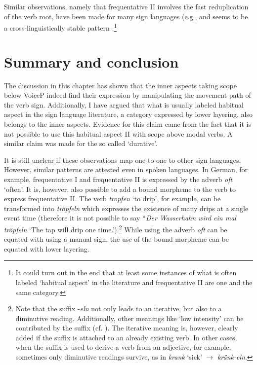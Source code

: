 \noindent Similar observations, namely that frequentative II involves the fast reduplication of the verb root, have been made for many sign languages (e.g., \citealt{bergmandahl1994, sutton1999linguistics, meir2007language} and seems to be a cross-linguistically stable pattern \citep[227]{signgram2017}.\footnote{ It could turn out in the end that at least some instances of what is often labeled `habitual aspect' in the literature and frequentative II are one and the same category. }


\largerpage
\section{Summary and conclusion}
The discussion in this chapter has shown that the inner aspects taking scope below VoiceP indeed find their expression by manipulating the movement path of the verb sign. Additionally, I have argued that what is usually labeled habitual aspect in the sign language literature, a category expressed by lower layering, also belongs to the inner aspects. Evidence for this claim came from the fact that it is not possible to use this habitual aspect II with scope above modal verbs. A similar claim was made for the so called `durative'.

It is still unclear if these observations map one-to-one to other sign languages. However, similar patterns are attested even in spoken languages. In German, for example, frequentative I and frequentative II is expressed by the adverb \textit{oft} `often'. It is, however, also possible to add a bound morpheme to the verb to express frequentative II. The verb \textit{tropfen} `to drip', for example, can be transformed into \textit{tröpfeln} which expresses the existence of many drips at a single event time (therefore it is not possible to say *\textit{Der Wasserhahn wird ein mal tröpfeln} `The tap will drip one time.').\footnote{ Note that the suffix -\textit{eln} not only leads to an iterative, but also to a diminutive reading. Additionally, other meanings like `low intensity' can be contributed by the suffix (cf. \citealt{weidhaasschmid2015diminutiv}). The iterative meaning is, however, clearly added if the suffix is attached to an already existing verb. In other cases, when the suffix is used to derive a verb from an adjective, for example, sometimes only diminutive readings survive, as in \textit{krank} `sick' $\rightarrow$ \textit{kränk-eln}.} While using the adverb \textit{oft} can be equated with using a manual sign, the use of the bound morpheme can be equated with lower layering.

